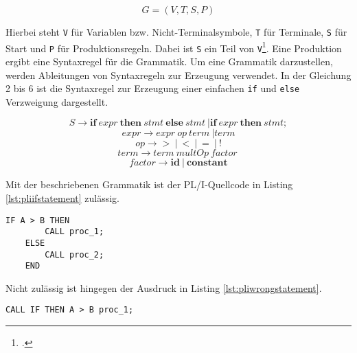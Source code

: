 \begin{center}
	\begin{equation}\label{eqn:grammar}
		G=(V,T,S,P)
	\end{equation}
\end{center}


Hierbei steht \verb+V+ für Variablen bzw. Nicht-Terminalsymbole, \verb+T+ für Terminale, \verb+S+ für Start und \verb+P+ für Produktionsregeln. Dabei ist \verb+S+ ein Teil von \verb+V+\footcite[Vgl.][S. 31ff.]{automata}. Eine Produktion ergibt eine Syntaxregel für die Grammatik. Um eine Grammatik darzustellen, werden Ableitungen von Syntaxregeln zur Erzeugung verwendet. In der Gleichung 2 bis 6 ist die Syntaxregel zur Erzeugung einer einfachen \verb+if+ und \verb+else+ Verzweigung dargestellt.

\begin{center}
	\begin{equation}\label{eqn:start}
		S \to \mathbf{if}\: expr\: \mathbf{then}\: stmt\: \mathbf{else}\: stmt\: | \mathbf{if}\: expr\: \mathbf{then}\: stmt;
	\end{equation}
	\begin{equation}
		expr \to expr\: op\: term\: | term
	\end{equation}
	\begin{equation}
		op \to \mathbf{>}\: |\: \mathbf{<}\: |\: \mathbf{=}\: |\: \mathbf{!}
	\end{equation}
	\begin{equation}
		term \to term\: multOp\: factor\:
	\end{equation}
	\begin{equation}
		factor \to \mathbf{id}\: |\: \mathbf{constant}
	\end{equation}
\end{center}

\pagebreak
Mit der beschriebenen Grammatik ist der PL/I-Quellcode in Listing \ref{lst:pliifstatement} zulässig.

\begin{lstlisting}[language=PL/I, caption=PL/I-Verzweigung, label={lst:pliifstatement}]
	IF A > B THEN
		CALL proc_1;
	ELSE
		CALL proc_2;
	END
\end{lstlisting}

Nicht zulässig ist hingegen der Ausdruck in Listing \ref{lst:pliwrongstatement}.

\begin{lstlisting}[language=PL/I, caption=Wrong Statement PL/I, label={lst:pliwrongstatement}]
	CALL IF THEN A > B proc_1;
\end{lstlisting}

